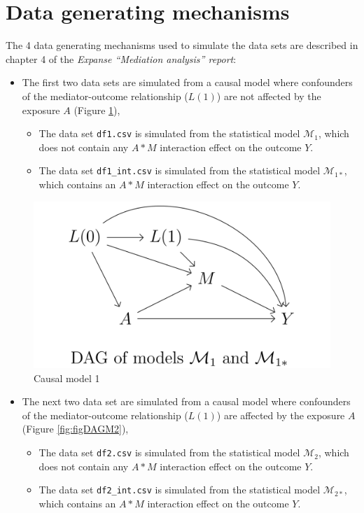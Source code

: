 \documentclass[
]{book}
\providecommand{\tightlist}{%
  \setlength{\itemsep}{0pt}\setlength{\parskip}{0pt}}
\begin{document}
\hypertarget{data-generating-mechanisms}{%
\section{Data generating mechanisms}\label{data-generating-mechanisms}}

The 4 data generating mechanisms used to simulate the data sets are described in chapter 4 of the \emph{Expanse ``Mediation analysis'' report}:

\begin{itemize}
\tightlist
\item
  The first two data sets are simulated from a causal model where confounders of the mediator-outcome relationship (\(L(1)\)) are not affected by the exposure \(A\) (Figure \ref{fig:figDAGM1}),

  \begin{itemize}
  \tightlist
  \item
    The data set \texttt{df1.csv} is simulated from the statistical model \(\mathcal{M}_1\), which does not contain any \(A \ast M\) interaction effect on the outcome \(Y\).
  \item
    The data set \texttt{df1\_int.csv} is simulated from the statistical model \(\mathcal{M}_{1 \ast}\), which contains an \(A \ast M\) interaction effect on the outcome \(Y\).
  \end{itemize}
\end{itemize}

\begin{figure}

{\centering \includegraphics[width=0.5\linewidth]{./figures/DAG_M1} 

}

\caption{Causal model 1}\label{fig:figDAGM1}
\end{figure}

\begin{itemize}
\tightlist
\item
  The next two data set are simulated from a causal model where confounders of the mediator-outcome relationship (\(L(1)\)) are affected by the exposure \(A\) (Figure \ref{fig:figDAGM2}),

  \begin{itemize}
  \tightlist
  \item
    The data set \texttt{df2.csv} is simulated from the statistical model \(\mathcal{M}_2\), which does not contain any \(A \ast M\) interaction effect on the outcome \(Y\).
  \item
    The data set \texttt{df2\_int.csv} is simulated from the statistical model \(\mathcal{M}_{2 \ast}\), which contains an \(A \ast M\) interaction effect on the outcome \(Y\).
  \end{itemize}
\end{itemize}
\end{document}
